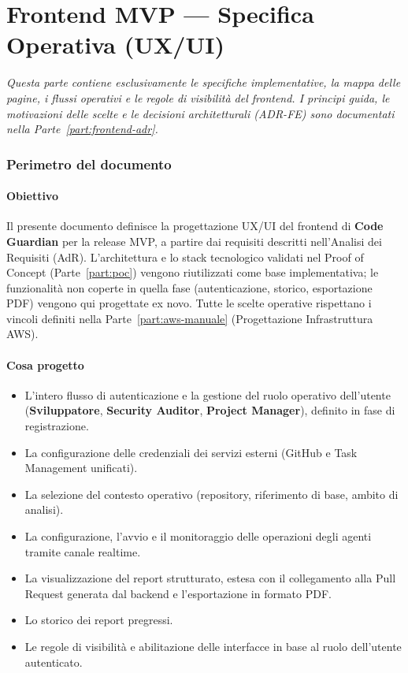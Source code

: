 \documentclass[11pt,a4paper]{article}
\begin{document}
\part{Frontend MVP --- Specifica Operativa (UX/UI)}
\label{part:frontend-spec}

\emph{Questa parte contiene esclusivamente le specifiche implementative, la mappa delle pagine, i flussi operativi e le regole di visibilità del frontend. I principi guida, le motivazioni delle scelte e le decisioni architetturali (ADR-FE) sono documentati nella Parte~\ref{part:frontend-adr}.}

\section{Perimetro del documento}
\label{sec:fe-perimetro}

\subsection{Obiettivo}

Il presente documento definisce la progettazione UX/UI del frontend di \textbf{Code Guardian} per la release MVP, a partire dai requisiti descritti nell'Analisi dei Requisiti (AdR). L'architettura e lo stack tecnologico validati nel Proof of Concept (Parte~\ref{part:poc}) vengono riutilizzati come base implementativa; le funzionalità non coperte in quella fase (autenticazione, storico, esportazione PDF) vengono qui progettate ex novo. Tutte le scelte operative rispettano i vincoli definiti nella Parte~\ref{part:aws-manuale} (Progettazione Infrastruttura AWS).

\subsection{Cosa progetto}
\label{sec:fe-cosa-progetto}

\begin{itemize}
    \item L'intero flusso di autenticazione e la gestione del ruolo operativo dell'utente (\textbf{Sviluppatore}, \textbf{Security Auditor}, \textbf{Project Manager}), definito in fase di registrazione.
    \item La configurazione delle credenziali dei servizi esterni (GitHub e Task Management unificati).
    \item La selezione del contesto operativo (repository, riferimento di base, ambito di analisi).
    \item La configurazione, l'avvio e il monitoraggio delle operazioni degli agenti tramite canale realtime.
    \item La visualizzazione del report strutturato, estesa con il collegamento alla Pull Request generata dal backend e l'esportazione in formato PDF.
    \item Lo storico dei report pregressi.
    \item Le regole di visibilità e abilitazione delle interfacce in base al ruolo dell'utente autenticato.
\end{itemize}
\end{document}

